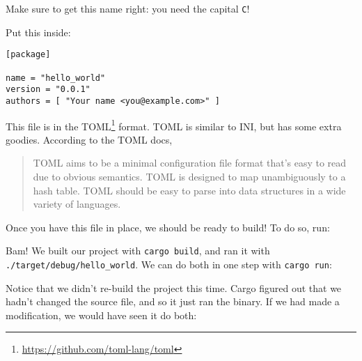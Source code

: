 \documentclass[a4paper,]{book}
\newenvironment{Shaded}{\begin{snugshade}}{\end{snugshade}}
\newcommand{\KeywordTok}[1]{\textcolor[rgb]{0.13,0.29,0.53}{\textbf{{#1}}}}
\newcommand{\NormalTok}[1]{{#1}}
\renewcommand{\href}[2]{#2\footnote{\url{#1}}}
\begin{document}
Make sure to get this name right: you need the capital \texttt{C}!

Put this inside:

\begin{verbatim}
[package]

name = "hello_world"
version = "0.0.1"
authors = [ "Your name <you@example.com>" ]
\end{verbatim}

This file is in the \href{https://github.com/toml-lang/toml}{TOML}
format. TOML is similar to INI, but has some extra goodies. According to
the TOML docs,

\begin{quote}
TOML aims to be a minimal configuration file format that's easy to read
due to obvious semantics. TOML is designed to map unambiguously to a
hash table. TOML should be easy to parse into data structures in a wide
variety of languages.
\end{quote}

Once you have this file in place, we should be ready to build! To do so,
run:

\begin{Shaded}
\end{Shaded}

Bam! We built our project with \texttt{cargo\ build}, and ran it with
\texttt{./target/debug/hello\_world}. We can do both in one step with
\texttt{cargo\ run}:

\begin{Shaded}
\end{Shaded}

Notice that we didn't re-build the project this time. Cargo figured out
that we hadn't changed the source file, and so it just ran the binary.
If we had made a modification, we would have seen it do both:

\begin{Shaded}
\end{Shaded}
\end{document}
